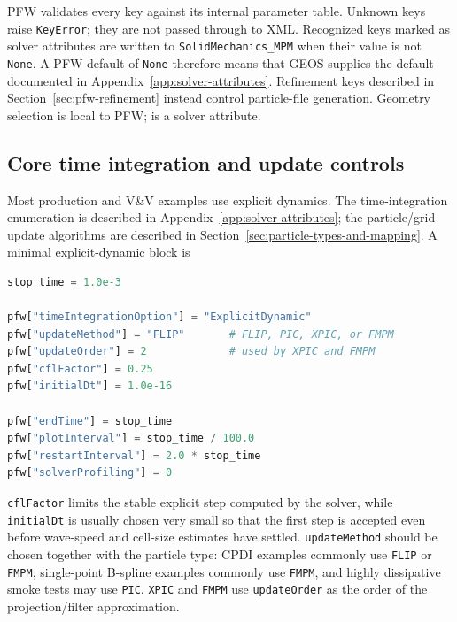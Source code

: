 PFW validates every key against its internal parameter table. Unknown keys raise \texttt{KeyError}; they are not passed through to XML. Recognized keys marked as solver attributes are written to \texttt{SolidMechanics\_MPM} when their value is not \texttt{None}. A PFW default of \texttt{None} therefore means that GEOS supplies the default documented in Appendix~\ref{app:solver-attributes}. Refinement keys described in Section~\ref{sec:pfw-refinement} instead control particle-file generation. Geometry selection is local to PFW;  is a solver attribute.

\subsection{Core time integration and update controls}

Most production and V\&V examples use explicit dynamics.  The time-integration enumeration is described in Appendix~\ref{app:solver-attributes}; the particle/grid update algorithms are described in Section~\ref{sec:particle-types-and-mapping}.  A minimal explicit-dynamic block is

\begin{lstlisting}[language=Python,caption={Minimal explicit-dynamic solver-control block.}]
stop_time = 1.0e-3

pfw["timeIntegrationOption"] = "ExplicitDynamic"
pfw["updateMethod"] = "FLIP"       # FLIP, PIC, XPIC, or FMPM
pfw["updateOrder"] = 2             # used by XPIC and FMPM
pfw["cflFactor"] = 0.25
pfw["initialDt"] = 1.0e-16

pfw["endTime"] = stop_time
pfw["plotInterval"] = stop_time / 100.0
pfw["restartInterval"] = 2.0 * stop_time
pfw["solverProfiling"] = 0
\end{lstlisting}

\texttt{cflFactor} limits the stable explicit step computed by the solver, while \texttt{initialDt} is usually chosen very small so that the first step is accepted even before wave-speed and cell-size estimates have settled.  \texttt{updateMethod} should be chosen together with the particle type: CPDI examples commonly use \texttt{FLIP} or \texttt{FMPM}, single-point B-spline examples commonly use \texttt{FMPM}, and highly dissipative smoke tests may use \texttt{PIC}.  \texttt{XPIC} and \texttt{FMPM} use \texttt{updateOrder} as the order of the projection/filter approximation.


